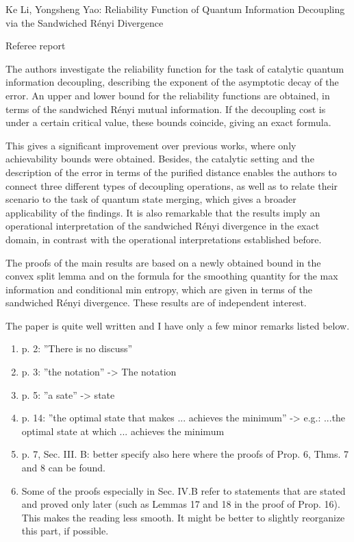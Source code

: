 \documentclass[12pt]{article}
\begin{document}
\begin{center}
{\large  Ke Li, Yongsheng Yao: Reliability Function of Quantum Information Decoupling via
the Sandwiched R\'enyi Divergence}

\end{center}
\medskip

\centerline{Referee report}

\bigskip

The authors investigate the reliability function for the task of catalytic quantum information
decoupling, describing the exponent of the asymptotic decay of the error. An upper and
lower bound for the reliability functions are obtained, in terms of the sandwiched R\'enyi
mutual information. If the decoupling cost is under a certain critical value, these bounds
coincide, giving an exact formula. 

This gives a significant improvement over previous works, where only achievability
bounds were obtained. Besides, the catalytic setting and the description of the error
in  terms of the purified distance enables the authors to connect three different types
of decoupling operations, as well as to relate their scenario to the task of quantum state merging,
which gives a broader applicability of the findings. It is also remarkable that the results imply an
operational interpretation of the sandwiched R\'enyi divergence in the exact domain, in
contrast with the operational interpretations established  before. 

The proofs of the main results  are based on a newly obtained bound in the convex split lemma  and
on  the formula for the smoothing quantity for the max information and conditional min entropy, which are
given in terms of the sandwiched R\'enyi divergence. These results are  of independent interest.

The paper is quite well written and I have only a few minor remarks listed below.

\noindent


\begin{enumerate}
\item  p. 2: ''There is no discuss''
\item p. 3: ''the notation'' -> The notation
\item p. 5: ''a sate'' -> state
\item p. 14: ''the optimal state that makes ... achieves the minimum'' -> e.g.: ...the
optimal state at which ... achieves the minimum
\item p. 7, Sec. III. B: better specify also here where the proofs of Prop. 6, Thms. 7 and
8 can be found. 
\item Some of the proofs especially in Sec. IV.B refer to statements that are stated and
proved only later (such as Lemmas 17 and 18 in the proof of Prop. 16). This makes the reading
less smooth. It might be better to slightly reorganize this part, if possible.




\end{enumerate}
\end{document}
